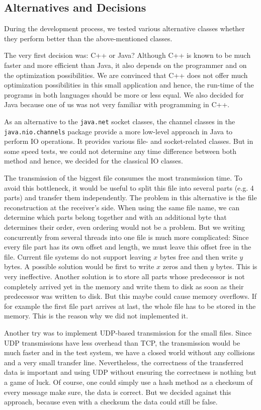 \documentclass[12pt,a4paper]{article}
\begin{document}
\subsection{Alternatives and Decisions}
During the development process, we tested various alternative classes whether they perform better than the above-mentioned classes.

The very first decision was: C++ or Java? Although C++ is known to be much faster and more efficient than Java, it also depends on the programmer and on the optimization possibilities. We are convinced that C++ does not offer much optimization possibilities in this small application and hence, the run-time of the programs in both languages should be more or less equal. We also decided for Java because one of us was not very familiar with programming in C++.

As an alternative to the \lstinline!java.net! socket classes, the channel classes in the \lstinline!java.nio.channels! package provide a more low-level approach in Java to perform IO operations. It provides various file- and socket-related classes. But in some speed tests, we could not determine any time difference between both method and hence, we decided for the classical IO classes.

The transmission of the biggest file consumes the most transmission time. To avoid this bottleneck, it would be useful to split this file into several parts (e.g. 4 parts) and transfer them independently. The problem in this alternative is the file reconstruction at the receiver's side. When using the same file name, we can determine which parts belong together and with an additional byte that determines their order, even ordering would not be a problem. But we writing concurrently from several threads into one file is much more complicated: Since every file part has its own offset and length, we must leave this offset free in the file. Current file systems do not support leaving $x$ bytes free and then write $y$ bytes. A possible solution would be first to write $x$ zeros and then $y$ bytes. This is very ineffective. Another solution is to store all parts whose predecessor is not completely arrived yet in the memory and write them to disk as soon as their predecessor was written to disk. But this maybe could cause memory overflows. If for example the first file part arrives at last, the whole file has to be stored in the memory. This is the reason why we did not implemented it.

Another try was to implement UDP-based transmission for the small files. Since UDP transmissions have less overhead than TCP, the transmission would be much faster and in the test system, we have a closed world without any collisions and a very small transfer line. Nevertheless, the correctness of the transferred data is important and using UDP without ensuring the correctness is nothing but a game of luck. Of course, one could simply use a hash method as a checksum of every message make sure, the data is correct. But we decided against this approach, because even with a checksum the data could still be false.
\end{document}
